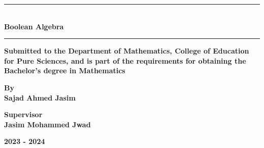 \begin{titlepage}
\begin{minipage}{0.2\textwidth}
\end{minipage}
\vspace{1cm}
\begin{center}
    \rule{100mm}{0.5mm}\\
   \Large \textbf{Boolean Algebra}\\
    \rule{100mm}{0.5mm}
\end{center}
\vfill
\begin{center}
    \textbf{Submitted to the Department of Mathematics, College of Education for Pure Sciences, and is part of the requirements for obtaining the Bachelor’s degree in Mathematics}
\end{center}
\vfill
\begin{center}
    \textbf{By}\\
    \textbf{Sajad Ahmed Jasim}
\end{center}
\vfill
\begin{center}
    \textbf{Supervisor}\\
\textbf{Jasim Mohammed Jwad}
\end{center}
\vfill
\begin{center}
    \textbf{2023 - 2024}
\end{center}
\end{titlepage}
